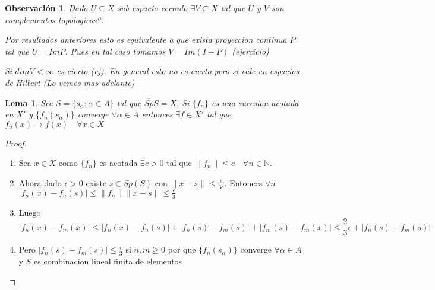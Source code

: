 \documentclass[10pt]{extarticle}
\theoremstyle{break}
\newtheorem{lemma}[theorem]{Lema}
\newtheorem*{remark}{Observación}
\theoremstyle{definition}
\begin{document}
\begin{remark}
	Dado $ U\subseteq X $ sub espacio cerrado $ \exists V\subseteq X $ tal que $ U $ y $ V $ son complementos topologicos?.

	Por resultados anteriores esto es equivalente a que exista proyeccion continua $ P $ tal que $ U=Im P $. Pues en tal caso tomamos $ V=Im(I-P) $ (ejercicio)

	Si $ dim V<\infty  $ es cierto (ej). En general esto no es cierto pero si vale en espacios de Hilbert (Lo vemos mas adelante)
\end{remark}

\begin{lemma}
	Sea $ S= \{s_{\alpha }: \alpha \in A\} $  tal que $ \overline{Sp}S=X $. Si $ \{f_{n} \} $ es una sucesion acotada en $ X' $ y $ \{f_{n} (s_{\alpha })\} $ converge $ \forall \alpha \in A  $ entonces $ \exists f\in X' $ tal que $ f_{n} (x)\longrightarrow f(x)\quad \forall x\in X  $  
\end{lemma}

\begin{proof}
	\begin{enumerate}
		\item Sea $ x\in X $ como $\{f_{n} \}$ es acotada $ \exists c>0 $ tal que $ \lVert f_{n}  \rVert \leq c \quad \forall n\in \mathbb{N} $.
		\item Ahora dado $ \epsilon >0 $ existe $ s\in Sp(S) $ con $ \lVert x-s \rVert \leq \frac{\epsilon }{3c} $. Entonces $ \forall n $ $ \lvert f_{n} (x)-f_{n} (s) \rvert \leq \lVert f_{n}  \rVert \lVert x-s \rVert \leq \frac{\epsilon }{3} $
		\item Luego $$\lvert f_{n} (x)-f_{m}(x) \rvert \leq \lvert f_{n} (x)-f_{n} (s) \rvert +\lvert f_{n} (s)-f_{m}(s) \rvert +\lvert f_{m}(s)-f_{m}(x) \rvert \leq \frac{2}{3}\epsilon +\lvert f_{n} (s)-f_{m}(s) \rvert $$ 
		\item Pero $ \lvert f_{n}(s)-f_{m}(s) \rvert \leq \frac{\epsilon }{3} $ si $ n,m\geq 0 $ por que $ \{f_{n}(s_{\alpha })\}$ converge $ \forall \alpha \in A  $ y $ S $ es combinacion lineal finita de elementos    
	\end{enumerate}
\end{proof}
\end{document}
